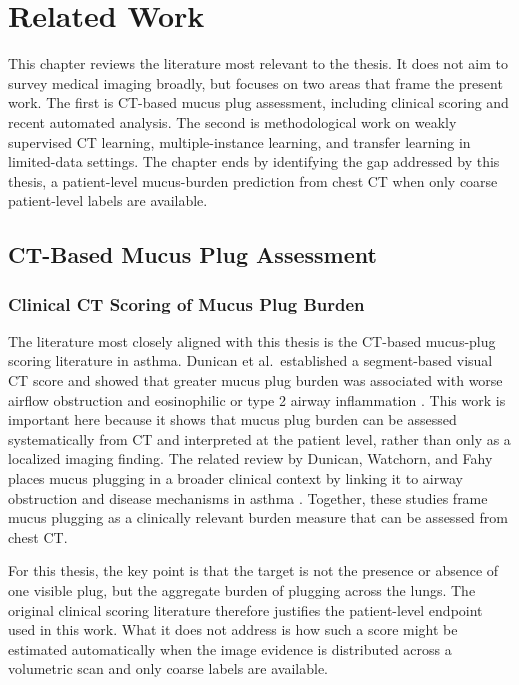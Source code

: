 \chapter{Related Work}

This chapter reviews the literature most relevant to the thesis. It does not aim to survey medical imaging broadly, but focuses on two areas that frame the present work. The first is CT-based mucus plug assessment, including clinical scoring and recent automated analysis. The second is methodological work on weakly supervised CT learning, multiple-instance learning, and transfer learning in limited-data settings. The chapter ends by identifying the gap addressed by this thesis, a patient-level mucus-burden prediction from chest CT when only coarse patient-level labels are available.


\section{CT-Based Mucus Plug Assessment}

\subsection{Clinical CT Scoring of Mucus Plug Burden}
The literature most closely aligned with this thesis is the CT-based mucus-plug scoring literature in asthma. Dunican et al.\ established a segment-based visual CT score and showed that greater mucus plug burden was associated with worse airflow obstruction and eosinophilic or type 2 airway inflammation \cite{dunican2018mucus}. This work is important here because it shows that mucus plug burden can be assessed systematically from CT and interpreted at the patient level, rather than only as a localized imaging finding. The related review by Dunican, Watchorn, and Fahy places mucus plugging in a broader clinical context by linking it to airway obstruction and disease mechanisms in asthma \cite{dunican2018autopsy}. Together, these studies frame mucus plugging as a clinically relevant burden measure that can be assessed from chest CT.

For this thesis, the key point is that the target is not the presence or absence of one visible plug, but the aggregate burden of plugging across the lungs. The original clinical scoring literature therefore justifies the patient-level endpoint used in this work. What it does not address is how such a score might be estimated automatically when the image evidence is distributed across a volumetric scan and only coarse labels are available.


